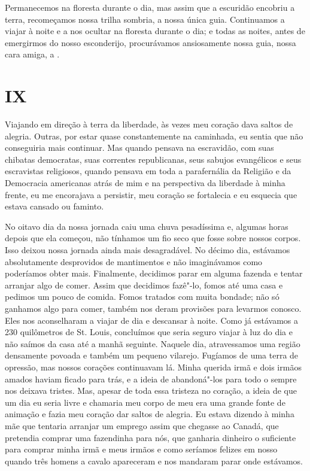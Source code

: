 Permanecemos na floresta durante o dia, mas assim que a escuridão
encobriu a terra, recomeçamos nossa trilha sombria, a 
nossa única guia. Continuamos a viajar à noite e a nos ocultar na
floresta durante o dia; e todas as noites, antes de emergirmos do nosso
esconderijo, procurávamos ansiosamente nossa guia, nossa cara amiga, a
.

\chapter{IX}

Viajando em direção à terra da liberdade, às vezes meu coração dava
saltos de alegria. Outras, por estar quase constantemente na caminhada,
eu sentia que não conseguiria mais continuar. Mas quando pensava na
escravidão, com suas chibatas democratas, suas correntes republicanas,
seus sabujos evangélicos e seus escravistas religiosos, quando pensava
em toda a parafernália da Religião e da Democracia americanas atrás de
mim e na perspectiva da liberdade à minha frente, eu me encorajava a
persistir, meu coração se fortalecia e eu esquecia que estava cansado ou
faminto.

No oitavo dia da nossa jornada caiu uma chuva pesadíssima e, algumas
horas depois que ela começou, não tínhamos um fio seco que fosse sobre
nossos corpos. Isso deixou nossa jornada ainda mais desagradável. No
décimo dia, estávamos absolutamente desprovidos de mantimentos e não
imaginávamos como poderíamos obter mais. Finalmente, decidimos parar 
em alguma fazenda e tentar arranjar algo de comer. Assim que decidimos
fazê"-lo, fomos até uma casa e pedimos um pouco de comida. Fomos tratados
com muita bondade; não só ganhamos algo para comer, também nos deram
provisões para levarmos conosco. Eles nos aconselharam a viajar de dia e
descansar à noite. Como já estávamos a 230 quilômetros de St. Louis,
concluímos que seria seguro viajar à luz do dia e não saímos da casa até
a manhã seguinte. Naquele dia, atravessamos uma região densamente
povoada e também um pequeno vilarejo. Fugíamos de uma terra de opressão,
mas nossos corações continuavam lá. Minha querida irmã e dois irmãos
amados haviam ficado para trás, e a ideia de abandoná"-los para todo o
sempre nos deixava tristes. Mas, apesar de toda essa tristeza no
coração, a ideia de que um dia eu seria livre e chamaria meu corpo de
meu era uma grande fonte de animação e fazia meu coração dar saltos de
alegria. Eu estava dizendo à minha mãe que tentaria arranjar um emprego
assim que chegasse ao Canadá, que pretendia comprar uma fazendinha para
nós, que ganharia dinheiro o suficiente para comprar minha irmã e meus
irmãos e como seríamos felizes em nosso  quando três homens a
cavalo apareceram e nos mandaram parar onde estávamos.


